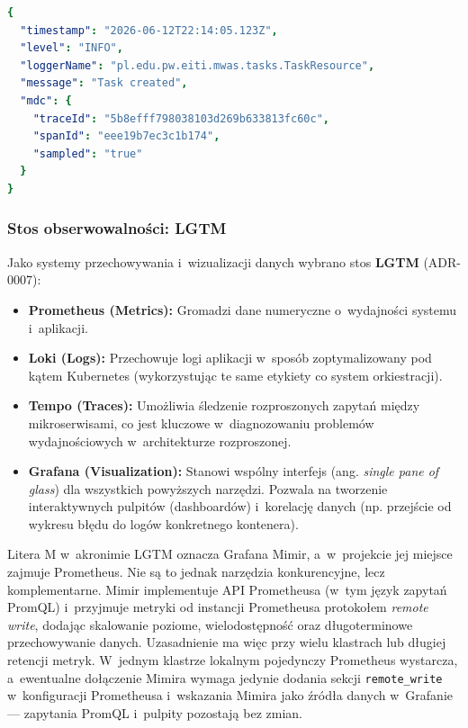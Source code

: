 \begin{lstlisting}[language=yaml, caption={Przykładowa linia logu JSON z~identyfikatorem śladu w~polu mdc.traceId}, label={lst:json-log}]
{
  "timestamp": "2026-06-12T22:14:05.123Z",
  "level": "INFO",
  "loggerName": "pl.edu.pw.eiti.mwas.tasks.TaskResource",
  "message": "Task created",
  "mdc": {
    "traceId": "5b8efff798038103d269b633813fc60c",
    "spanId": "eee19b7ec3c1b174",
    "sampled": "true"
  }
}
\end{lstlisting}

\subsubsection{Stos obserwowalności: LGTM}
Jako systemy przechowywania i~wizualizacji danych wybrano stos \textbf{LGTM} (ADR-0007):
\begin{itemize}
    \item \textbf{Prometheus (Metrics):} Gromadzi dane numeryczne o~wydajności systemu i~aplikacji.
    \item \textbf{Loki (Logs):} Przechowuje logi aplikacji w~sposób zoptymalizowany pod kątem Kubernetes (wykorzystując te same etykiety co system orkiestracji).
    \item \textbf{Tempo (Traces):} Umożliwia śledzenie rozproszonych zapytań między mikroserwisami, co jest kluczowe w~diagnozowaniu problemów wydajnościowych w~architekturze rozproszonej.
    \item \textbf{Grafana (Visualization):} Stanowi wspólny interfejs (ang. \textit{single pane of glass}) dla wszystkich powyższych narzędzi. Pozwala na tworzenie interaktywnych pulpitów (dashboardów) i~korelację danych (np. przejście od wykresu błędu do logów konkretnego kontenera).
\end{itemize}

Litera M w~akronimie LGTM oznacza Grafana Mimir, a~w~projekcie jej miejsce zajmuje Prometheus. Nie są to jednak narzędzia konkurencyjne, lecz komplementarne. Mimir implementuje API Prometheusa (w~tym język zapytań PromQL) i~przyjmuje metryki od instancji Prometheusa protokołem \textit{remote write}, dodając skalowanie poziome, wielodostępność oraz długoterminowe przechowywanie danych. Uzasadnienie ma więc przy wielu klastrach lub długiej retencji metryk. W~jednym klastrze lokalnym pojedynczy Prometheus wystarcza, a~ewentualne dołączenie Mimira wymaga jedynie dodania sekcji \texttt{remote\_write} w~konfiguracji Prometheusa i~wskazania Mimira jako źródła danych w~Grafanie --- zapytania PromQL i~pulpity pozostają bez zmian.

